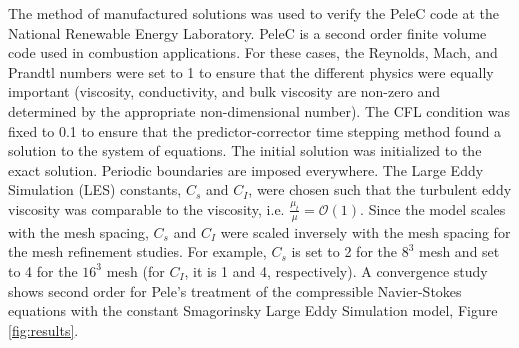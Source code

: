 \documentclass[10pt]{article}
\begin{document}
The method of manufactured solutions was used to verify the PeleC code
at the National Renewable Energy Laboratory. PeleC is a second order
finite volume code used in combustion applications. For these cases,
the Reynolds, Mach, and Prandtl numbers were set to 1 to ensure that
the different physics were equally important (viscosity, conductivity,
and bulk viscosity are non-zero and determined by the appropriate
non-dimensional number). The CFL condition was fixed to 0.1 to ensure
that the predictor-corrector time stepping method found a solution to
the system of equations. The initial solution was initialized to the
exact solution. Periodic boundaries are imposed everywhere. The Large
Eddy Simulation (LES) constants, $C_s$ and $C_I$, were chosen such
that the turbulent eddy viscosity was comparable to the viscosity,
i.e. $\frac{\mu_t}{\mu} = \mathcal{O}(1)$. Since the model scales with
the mesh spacing, $C_s$ and $C_I$ were scaled inversely with the mesh
spacing for the mesh refinement studies. For example, $C_s$ is set to
2 for the $8^3$ mesh and set to 4 for the $16^3$ mesh (for $C_I$, it
is 1 and 4, respectively). A convergence study shows second order for
Pele's treatment of the compressible Navier-Stokes equations with the
constant Smagorinsky Large Eddy Simulation model,
Figure\,\ref{fig:results}.
\end{document}
